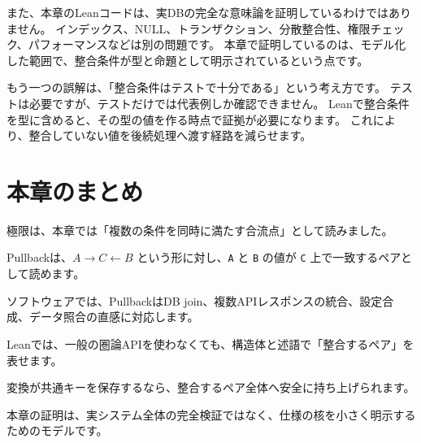 また、本章のLeanコードは、実DBの完全な意味論を証明しているわけではありません。
インデックス、NULL、トランザクション、分散整合性、権限チェック、パフォーマンスなどは別の問題です。
本章で証明しているのは、モデル化した範囲で、整合条件が型と命題として明示されているという点です。

もう一つの誤解は、「整合条件はテストで十分である」という考え方です。
テストは必要ですが、テストだけでは代表例しか確認できません。
Leanで整合条件を型に含めると、その型の値を作る時点で証拠が必要になります。
これにより、整合していない値を後続処理へ渡す経路を減らせます。

\section{本章のまとめ}

極限は、本章では「複数の条件を同時に満たす合流点」として読みました。

Pullbackは、\(A \to C \leftarrow B\) という形に対し、\texttt{A} と \texttt{B} の値が \texttt{C} 上で一致するペアとして読めます。

ソフトウェアでは、PullbackはDB join、複数APIレスポンスの統合、設定合成、データ照合の直感に対応します。

Leanでは、一般の圏論APIを使わなくても、構造体と述語で「整合するペア」を表せます。

変換が共通キーを保存するなら、整合するペア全体へ安全に持ち上げられます。

本章の証明は、実システム全体の完全検証ではなく、仕様の核を小さく明示するためのモデルです。
